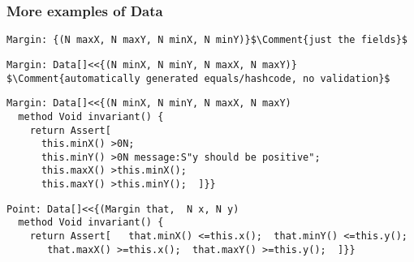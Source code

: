 \begin{frame}[fragile]
\frametitle{More examples of Data}
\begin{NiceCode}{59ex}{0.8}
\begin{lstlisting}
Margin: {(N maxX, N maxY, N minX, N minY)}$\Comment{just the fields}$
\end{lstlisting}
\end{NiceCode}
\PresentationOnly\pause
\begin{NiceCode}{59ex}{0.8}
\begin{lstlisting}
Margin: Data[]<<{(N minX, N minY, N maxX, N maxY)}
$\Comment{automatically generated equals/hashcode, no validation}$
\end{lstlisting}
\end{NiceCode}
\PresentationOnly{}
\begin{NiceCode}{59ex}{0.8}
\begin{lstlisting}
Margin: Data[]<<{(N minX, N minY, N maxX, N maxY)
  method Void invariant() {
    return Assert[
      this.minX() >0N;
      this.minY() >0N message:S"y should be positive";
      this.maxX() >this.minX();
      this.maxY() >this.minY();  ]}}
\end{lstlisting}
\end{NiceCode}
\PresentationOnly{}
\begin{NiceCode}{59ex}{0.8}
\begin{lstlisting}
Point: Data[]<<{(Margin that,  N x, N y)
  method Void invariant() {
    return Assert[   that.minX() <=this.x();  that.minY() <=this.y();
       that.maxX() >=this.x();  that.maxY() >=this.y();  ]}}
\end{lstlisting}
\end{NiceCode}

\end{frame}



